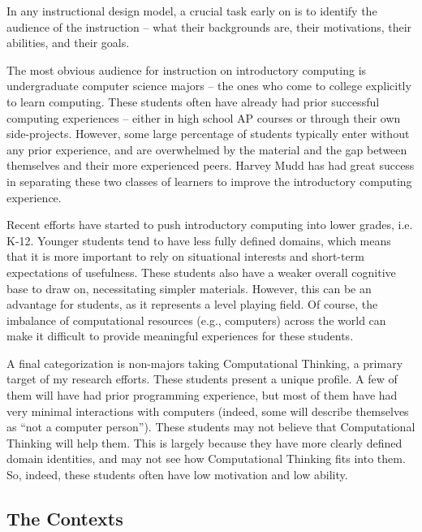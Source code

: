 In any instructional design model, a crucial task early on is to identify the audience of the instruction -- what their backgrounds are, their motivations, their abilities, and their goals.

The most obvious audience for instruction on introductory computing is undergraduate computer science majors -- the ones who come to college explicitly to learn computing. 
These students often have already had prior successful computing experiences -- either in high school AP courses or through their own side-projects.
However, some large percentage of students typically enter without any prior experience, and are overwhelmed by the material and the gap between themselves and their more experienced peers.
Harvey Mudd has had great success in separating these two classes of learners to improve the introductory computing experience.~\cite{Alvarado:2010:WCE:1734263.1734281}

Recent efforts have started to push introductory computing into lower grades, i.e. K-12.
Younger students tend to have less fully defined domains, which means that it is more important to rely on situational interests and short-term expectations of usefulness.
These students also have a weaker overall cognitive base to draw on, necessitating simpler materials.
However, this can be an advantage for students, as it represents a level playing field.
Of course, the imbalance of computational resources (e.g., computers) across the world can make it difficult to provide meaningful experiences for these students.

A final categorization is non-majors taking Computational Thinking, a primary target of my research efforts.
These students present a unique profile.
A few of them will have had prior programming experience, but most of them have had very minimal interactions with computers (indeed, some will describe themselves as ``not a computer person'').
These students may not believe that Computational Thinking will help them.
This is largely because they have more clearly defined domain identities, and may not see how Computational Thinking fits into them.
So, indeed, these students often have low motivation and low ability.

\subsection{The Contexts}

